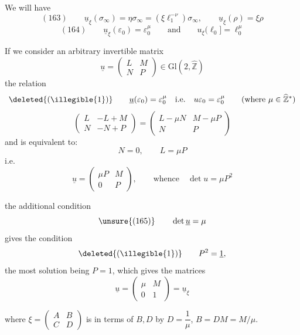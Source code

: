  We will have
\[
(163)\qquad
\underline u_\xi(\sigma_\infty)
=\eta\sigma_\infty
=(\xi \ell_1^{-\nu})\sigma_\infty,
\qquad
\underline u_\xi(\rho)=\xi\rho
\]
\[
(164)\qquad
\underline u_\xi(\varepsilon_0)=\varepsilon_0^\mu
\qquad\text{and}\qquad
u_\xi(\ell_0]=\ell_0^\mu
\]


If we consider an arbitrary invertible matrix
\[
\underline u=\begin{pmatrix}L&M\\N&P\end{pmatrix}
\in\mathrm{Gl}(2,\widehat{\mathbb Z})
\]
the relation
\[
\deleted{(\illegible{1})}\qquad
\underline u(\varepsilon_0)=\varepsilon_0^\mu
\quad\text{i.e.}\quad
u\varepsilon_0=\varepsilon_0^\mu
\qquad(\text{where }\mu\in\widehat{\mathbb Z}^{*})
\]
\[
\begin{pmatrix}L&-L+M\\N&-N+P\end{pmatrix}
=\begin{pmatrix}L-\mu N&M-\mu P\\N&P\end{pmatrix}
\]
and is equivalent to: 
\[
N=0,\qquad L=\mu P
\]
i.e.
\[
\underline u=\begin{pmatrix}\mu P&M\\0&P\end{pmatrix},
\qquad\text{whence}\quad\det u=\mu P^2
\]

the additional condition
\[
\unsure{(165)}\qquad \det\underline u=\mu
\]
gives the condition
\[
\deleted{(\illegible{1})}\qquad P^2=\underline 1,
\]
the most  solution being $P=1$,
which gives  the matrices
\[
\underline u=\begin{pmatrix}\mu&M\\0&1\end{pmatrix}
=\underline u_\xi
\]


where $\xi=\begin{pmatrix}A&B\\C&D\end{pmatrix}$
 is  in terms of
$B,D$ by $D=\dfrac1\mu$, $B=DM=M/\mu$.

